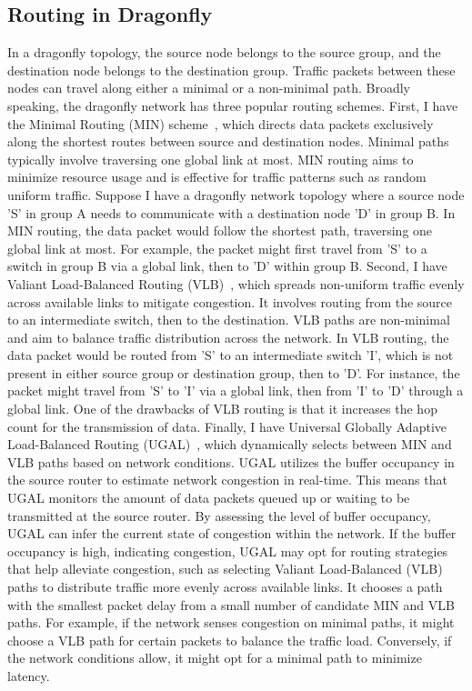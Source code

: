 \subsection{Routing in Dragonfly}
In a dragonfly topology, the source node belongs to the source group, and the destination node belongs to the destination group. Traffic packets between these nodes can travel along either a minimal or a non-minimal path. Broadly speaking, the dragonfly network has three popular routing schemes.
First, I have the Minimal Routing (MIN) scheme~\cite{kim2008technology}, which directs data packets exclusively along the shortest routes between source and destination nodes. Minimal paths typically involve traversing one global link at most. MIN routing aims to minimize resource usage and is effective for traffic patterns such as random uniform traffic. Suppose I have a dragonfly network topology where a source node 'S' in group A needs to communicate with a destination node 'D' in group B. In MIN routing, the data packet would follow the shortest path, traversing one global link at most. For example, the packet might first travel from 'S' to a switch in group B via a global link, then to 'D' within group B.
Second, I have Valiant Load-Balanced Routing (VLB)~\cite{kim2008technology, kaplan2017unveiling}, which spreads non-uniform traffic evenly across available links to mitigate congestion. It involves routing from the source to an intermediate switch, then to the destination. VLB paths are non-minimal and aim to balance traffic distribution across the network. In VLB routing, the data packet would be routed from 'S' to an intermediate switch 'I', which is not present in either source group or destination group, then to 'D'. For instance, the packet might travel from 'S' to 'I' via a global link, then from 'I' to 'D' through a global link. One of the drawbacks of VLB routing is that it increases the hop count for the transmission of data.
Finally, I have Universal Globally Adaptive Load-Balanced Routing (UGAL)~\cite{kim2008technology, kaplan2017unveiling}, which dynamically selects between MIN and VLB paths based on network conditions. UGAL utilizes the buffer occupancy in the source router to estimate network congestion in real-time. This means that UGAL monitors the amount of data packets queued up or waiting to be transmitted at the source router. By assessing the level of buffer occupancy, UGAL can infer the current state of congestion within the network. If the buffer occupancy is high, indicating congestion, UGAL may opt for routing strategies that help alleviate congestion, such as selecting Valiant Load-Balanced (VLB) paths to distribute traffic more evenly across available links. It chooses a path with the smallest packet delay from a small number of candidate MIN and VLB paths. For example, if the network senses congestion on minimal paths, it might choose a VLB path for certain packets to balance the traffic load. Conversely, if the network conditions allow, it might opt for a minimal path to minimize latency.




